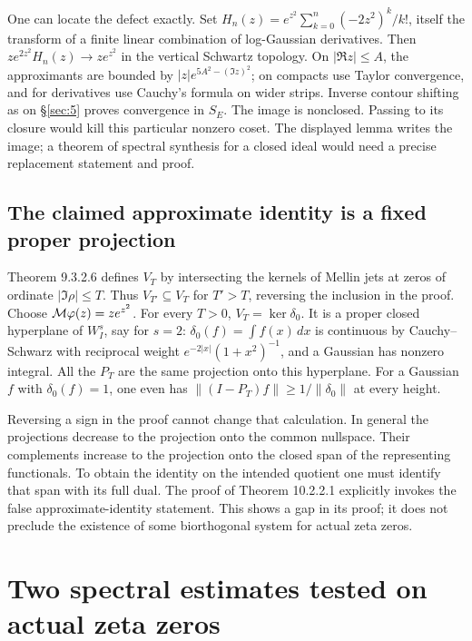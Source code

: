 \documentclass[11pt,reqno]{amsart}
\numberwithin{equation}{section}
\begin{document}
One can locate the defect exactly. Set \(H_n(z)=e^{z^2}\sum_{k=0}^n(-2z^2)^k/k!\), itself the transform of a finite linear combination of log-Gaussian derivatives. Then \(z e^{2z^2}H_n(z)\to z e^{z^2}\) in the vertical Schwartz topology. On \(|\Re z|\le A\), the approximants are bounded by \(|z|e^{5A^2-(\Im z)^2}\); on compacts use Taylor convergence, and for derivatives use Cauchy's formula on wider strips. Inverse contour shifting as on \S\ref{sec:5} proves convergence in \(S_E\). The image is nonclosed. Passing to its closure would kill this particular nonzero coset. The displayed lemma writes the image; a theorem of spectral synthesis for a closed ideal would need a precise replacement statement and proof.

\subsection*{The claimed approximate identity is a fixed proper projection}
Theorem 9.3.2.6 defines \(V_T\) by intersecting the kernels of Mellin jets at zeros of ordinate \(|\Im\rho|\le T\). Thus \(V_{T'}\subseteq V_T\) for \(T'>T\), reversing the inclusion in the proof. Choose \(\mathcal M\varphi(z)=ze^{z^2}\). For every \(T>0\), \(V_T=\ker\delta_0\). It is a proper closed hyperplane of \(W_I^s\), say for \(s=2\): \(\delta_0(f)=\int f(x)\,dx\) is continuous by Cauchy--Schwarz with reciprocal weight \(e^{-2|x|}(1+x^2)^{-1}\), and a Gaussian has nonzero integral. All the \(P_T\) are the same projection onto this hyperplane. For a Gaussian \(f\) with \(\delta_0(f)=1\), one even has \(\|(I-P_T)f\|\ge1/\|\delta_0\|\) at every height.

Reversing a sign in the proof cannot change that calculation. In general the projections decrease to the projection onto the common nullspace. Their complements increase to the projection onto the closed span of the representing functionals. To obtain the identity on the intended quotient one must identify that span with its full dual. The proof of Theorem 10.2.2.1 explicitly invokes the false approximate-identity statement. This shows a gap in its proof; it does not preclude the existence of some biorthogonal system for actual zeta zeros.


\section{Two spectral estimates tested on actual zeta zeros}\label{sec:7}
\end{document}
